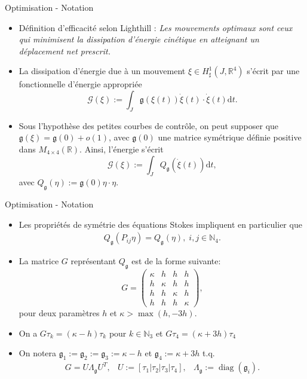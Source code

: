 \documentclass[10pt, envcountsect]{beamer}
\theoremstyle{plain}
\newcommand{\N}{\mathbb{N}}
\newcommand{\R}{\mathbb{R}}
\DeclareMathOperator{\diag}{diag}
\newcommand{\dd}[1]{\mathrm{d}#1}
\begin{document}
\begin{frame}{Optimisation - Notation}
\begin{itemize}
\item Définition d'efficacité selon Lighthill \cite{Lighthill1952}: \emph{Les mouvements optimaux sont ceux qui minimisent la dissipation d'énergie cinétique en atteignant un déplacement net prescrit.}

\item La dissipation d'énergie due à un mouvement $\xi \in H^1_{\sharp}(J, \R^4)$ s'écrit par une fonctionnelle d'énergie appropriée
\begin{equation}
 \mathcal{G}(\xi) := \int_{J} \mathfrak{g}(\xi(t))\dot{\xi}(t) \cdot \dot{\xi}(t) \dd t.
\end{equation}

\item Sous l'hypothèse des petites courbes de contrôle, on peut supposer que $\mathfrak{g}(\xi) = \mathfrak{g}(0) + o(1)$, avec $\mathfrak{g}(0)$ une matrice symétrique définie positive dans $M_{4 \times 4}(\R)$. Ainsi, l'énergie s'écrit
\begin{equation}
\label{eq: linearized energy functional}
	\mathcal{G}(\xi) := \int_{J} Q_{\mathfrak{g}}(\dot{\xi}(t))\dd t,
\end{equation}
avec $Q_{\mathfrak{g}}(\eta) := \mathfrak{g}(0)\eta \cdot \eta$.
\end{itemize}
\end{frame}

\begin{frame}{Optimisation - Notation}
\begin{itemize}
\item Les propriétés de symétrie des équations Stokes impliquent en particulier que
\begin{align}
	Q_{\mathfrak{g}}(P_{ij} \eta) = Q_{\mathfrak{g}}(\eta),\; i,j \in \N_4.
\end{align}

\item La matrice $G$ représentant $Q_{\mathfrak{g}}$ est de la forme suivante:
\begin{equation}
G = \left ( \begin{array}{cccc}
\kappa & h & h & h \\ 
h & \kappa & h & h \\ 
h & h & \kappa & h \\ 
h & h & h & \kappa
\end{array} \right ),
\end{equation}
pour deux paramètres $h$ et $\kappa > \max(h, -3h)$.
\item On a $G \tau_k = (\kappa - h ) \tau_k$ pour $k \in  \N_3$ et $G \tau_4 = (\kappa + 3h) \tau_4$
\item On notera $\mathfrak{g}_1 := \mathfrak{g}_2 := \mathfrak{g}_3 := \kappa - h$ et $\mathfrak{g}_4 := \kappa + 3h$ t.q.
\begin{eqnarray}
G = U \Lambda_{\mathfrak{g}} U^T, & U := [\tau_1 | \tau_2 |\tau_3 |\tau_4], & \Lambda_{\mathfrak{g}} := \diag(\mathfrak{g}_i).
\end{eqnarray}
\end{itemize}
\end{frame}
\end{document}
